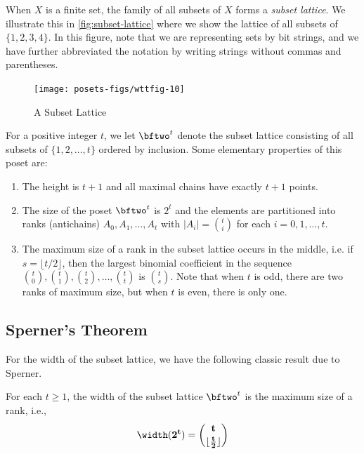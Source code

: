 When $X$ is a finite set, the family of all
subsets of $X$ forms a \textit{subset lattice}.  We illustrate this
in \autoref{fig:subset-lattice} where we show the lattice
of all subsets of $\{1,2,3,4\}$. In this figure, note that we
are representing sets by bit strings, and we have further abbreviated
the notation by writing strings without commas and parentheses.

\begin{figure}
\begin{center}
\texttt{[image: posets-figs/wttfig-10]}
\caption{A Subset Lattice}
\label{fig:subset-lattice}
\end{center}
\end{figure}

For a positive integer $t$, we let $\bftwo^t$ denote the subset
lattice consisting of all subsets of $\{1,2,\dots,t\}$
ordered by inclusion.  Some elementary properties of this
poset are:

\begin{enumerate}
\item The height is $t+1$ and all maximal chains have exactly
$t+1$ points.
\item The size of the poset $\bftwo^t$ is $2^t$ and the elements
are partitioned into ranks (antichains) $A_0, A_1,\dots, A_t$
with $|A_i|=\binom{t}{i}$ for each $i=0,1,\dots,t$.
\item The maximum size of a rank in the subset lattice occurs
in the middle, i.e. if $s=\lfloor t/2\rfloor$, then the
largest binomial coefficient in the sequence $\binom{t}{0},
\binom{t}{1},\binom{t}{2},\dots,\binom{t}{t}$ is $\binom{t}{s}$.
Note that when $t$ is odd, there are two ranks of maximum size,
but when $t$ is even, there is only one.
\end{enumerate}

\subsection{Sperner's Theorem}\label{ss:posets:subset-lattice:sperner}

For the width of the subset lattice, we have the following
classic result due to Sperner.

\begin{theorem}[Sperner]\label{thm:sperner}
For each $t\ge1$, the width of the subset lattice $\bftwo^t$
is the maximum size of a rank, i.e., 
\[
\width(\bf2^t)=\binom{t}{\lfloor\frac{t}{2}\rfloor}
\]
\end{theorem}

